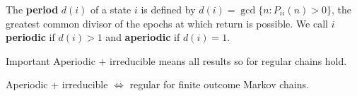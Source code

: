 \begin{definition}
The \textbf{period} $d(i)$ of a state $i$ is defined by $d(i) = \gcd\{n : P_{ii}(n) > 0\}$, the greatest common divisor of the epochs at which return is possible. We call $i$ \textbf{periodic} if $d(i) > 1$ and \textbf{aperiodic} if $d(i) = 1$.
\end{definition}

\begin{newnotion}{Important}
Aperiodic + irreducible means all results so for regular chains hold.
\end{newnotion}

\begin{remark}
Aperiodic + irreducible $\Leftrightarrow$ regular for finite outcome Markov chains.
\end{remark}

